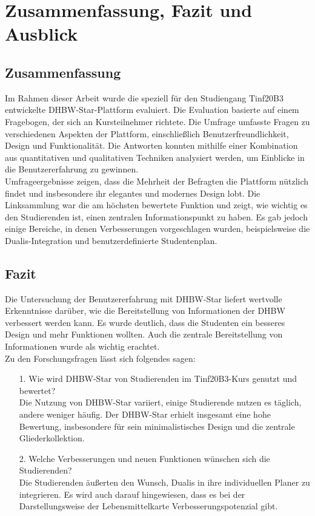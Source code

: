 \chapter{Zusammenfassung, Fazit und Ausblick}

\section{Zusammenfassung}
Im Rahmen dieser Arbeit wurde die speziell für den Studiengang Tinf20B3 entwickelte DHBW-Star-Plattform evaluiert. Die Evaluation basierte auf einem Fragebogen, der sich an Kursteilnehmer richtete. Die Umfrage umfasste Fragen zu verschiedenen Aspekten der Plattform, einschließlich Benutzerfreundlichkeit, Design und Funktionalität. Die Antworten konnten mithilfe einer Kombination aus quantitativen und qualitativen Techniken analysiert werden, um Einblicke in die Benutzererfahrung zu gewinnen.\\
 
Umfrageergebnisse zeigen, dass die Mehrheit der Befragten die Plattform nützlich findet und insbesondere ihr elegantes und modernes Design lobt. Die Linksammlung war die am höchsten bewertete Funktion und zeigt, wie wichtig es den Studierenden ist, einen zentralen Informationspunkt zu haben. Es gab jedoch einige Bereiche, in denen Verbesserungen vorgeschlagen wurden, beispielsweise die Dualis-Integration und benutzerdefinierte Studentenplan.
\newpage
\section{Fazit}
Die Untersuchung der Benutzererfahrung mit DHBW-Star liefert wertvolle Erkenntnisse darüber, wie die Bereitstellung von Informationen der DHBW verbessert werden kann. Es wurde deutlich, dass die Studenten ein besseres Design und mehr Funktionen wollten. Auch die zentrale Bereitstellung von Informationen wurde als wichtig erachtet. 
\\
Zu den Forschungsfragen lässt sich folgendes sagen:
\begin{itemize}
	\item [1.] Wie wird DHBW-Star von Studierenden im Tinf20B3-Kurs genutzt und bewertet?\\
	Die Nutzung von DHBW-Star variiert, einige Studierende nutzen es täglich, andere weniger häufig. Der DHBW-Star erhielt insgesamt eine hohe Bewertung, insbesondere für sein minimalistisches Design und die zentrale Gliederkollektion. 
	\item[2.]Welche Verbesserungen und neuen Funktionen wünschen sich die Studierenden?\\
	Die Studierenden äußerten den Wunsch, Dualis in ihre individuellen Planer zu integrieren. Es wird auch darauf hingewiesen, dass es bei der Darstellungsweise der Lebensmittelkarte Verbesserungspotenzial gibt.
\end{itemize}

